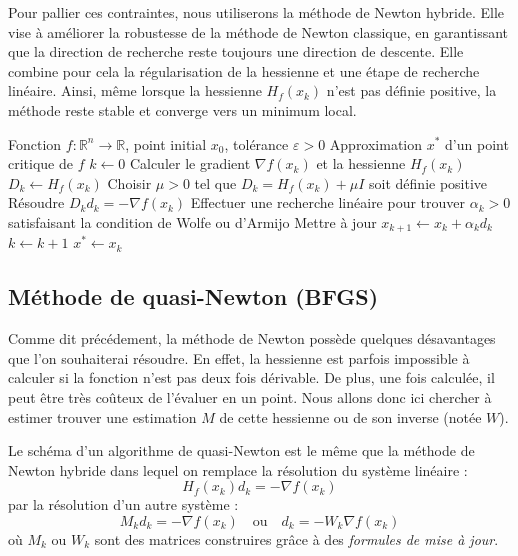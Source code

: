 Pour pallier ces contraintes, nous utiliserons la méthode de Newton hybride. 
Elle vise à améliorer la robustesse de la méthode de Newton classique, 
en garantissant que la direction de recherche reste toujours une direction de descente. 
Elle combine pour cela la régularisation de la hessienne et une étape de recherche linéaire. 
Ainsi, même lorsque la hessienne $H_f(x_k)$ n’est pas définie positive, la méthode reste stable et converge vers un minimum local.

\begin{algorithm}[H]
    \caption{Méthode de Newton hybride (régularisée avec recherche linéaire)}
    \begin{algorithmic}[1]
        \Require Fonction $f : \mathbb{R}^n \to \mathbb{R}$, point initial $x_0$, tolérance $\varepsilon > 0$
        \Ensure Approximation $x^*$ d’un point critique de $f$
        \State $k \gets 0$
            \State Calculer le gradient $\nabla f(x_k)$ et la hessienne $H_f(x_k)$
                \State $D_k \gets H_f(x_k)$
            \Else
                \State Choisir $\mu > 0$ tel que $D_k = H_f(x_k) + \mu I$ soit définie positive
            \EndIf
            \State Résoudre $D_k d_k = - \nabla f(x_k)$
            \State Effectuer une recherche linéaire pour trouver $\alpha_k > 0$ satisfaisant la condition de Wolfe ou d’Armijo
            \State Mettre à jour $x_{k+1} \gets x_k + \alpha_k d_k$
            \State $k \gets k + 1$
        \EndWhile
        \State \Return $x^* \gets x_k$
    \end{algorithmic}
\end{algorithm}

\subsection{Méthode de quasi-Newton (BFGS)}

Comme dit précédement, la méthode de Newton possède quelques désavantages que l'on souhaiterai résoudre. 
En effet, la hessienne est parfois impossible à calculer si la fonction n'est pas deux fois dérivable. De plus, 
une fois calculée, il peut être très coûteux de l'évaluer en un point. Nous allons donc ici chercher 
à estimer trouver une estimation $M$ de cette hessienne ou de son inverse (notée $W$).

Le schéma d'un algorithme de quasi-Newton est le même que la méthode de Newton hybride dans lequel on 
remplace la résolution du système linéaire : 
    $$ H_f(x_k) d_k = - \nabla f(x_k) $$ 
par la résolution d'un autre système : 
    $$ M_k d_k = - \nabla f(x_k) \quad \text{ou} \quad d_k = - W_k \nabla f(x_k)$$ 
où $M_k$ ou $W_k$ sont des matrices construires grâce à des \emph{formules de mise à jour}. 

